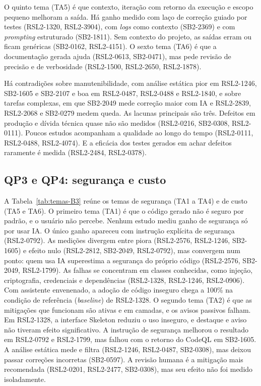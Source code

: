 O quinto tema (TA5) é que contexto, iteração com retorno da execução e escopo
pequeno melhoram a saída. Há ganho medido com laço de correção guiado por
testes (RSL2-1320, RSL2-3904), com \textit{logs} como contexto (SB2-2369) e
com \textit{prompting} estruturado (SB2-1811). Sem contexto do projeto, as
saídas erram ou ficam genéricas (SB2-0162, RSL2-4151). O sexto tema (TA6) é
que a documentação gerada ajuda (RSL2-0613, SB2-0471), mas pede revisão de
precisão e de verbosidade (RSL2-1500, RSL2-2650, RSL2-1878).

Há contradições sobre manutenibilidade, com análise estática pior em
RSL2-1246, SB2-1605 e SB2-2107 e boa em RSL2-0487, RSL2-0488 e RSL2-1840, e
sobre tarefas complexas, em que SB2-2049 mede correção maior com IA e
RSL2-2839, RSL2-2068 e SB2-0279 medem queda. As lacunas principais são três.
Defeitos em produção e dívida técnica quase não são medidos (RSL2-0216,
SB2-0308, RSL2-0111). Poucos estudos acompanham a qualidade ao longo do tempo
(RSL2-0111, RSL2-0488, RSL2-4074). E a eficácia dos testes gerados em achar
defeitos raramente é medida (RSL2-2484, RSL2-0378).

\subsection{QP3 e QP4: segurança e custo}
\label{sec:resultados-rsl2-qp3-qp4}



A Tabela~\ref{tab:temas-B3} reúne os temas de segurança (TA1 a TA4) e de
custo (TA5 e TA6). O primeiro tema (TA1) é que o código gerado não é seguro
por padrão, e o usuário não percebe. Nenhum estudo mediu ganho de segurança só
por usar IA. O único ganho apareceu com instrução explícita de segurança
(RSL2-0792). As medições divergem entre piora (RSL2-2576, RSL2-1246,
SB2-1605) e efeito nulo (RSL2-2812, SB2-2049, RSL2-0792), mas convergem num
ponto: quem usa IA superestima a segurança do próprio código (RSL2-2576,
SB2-2049, RSL2-1799). As falhas se concentram em classes conhecidas, como
injeção, criptografia, credenciais e dependências (RSL2-1328, RSL2-1246,
RSL2-0906). Com assistente envenenado, a adoção de código inseguro chega a
100\% na condição de referência (\textit{baseline}) de RSL2-1328. O segundo
tema (TA2) é que as mitigações que funcionam são ativas e em camadas, e os
avisos passivos falham. Em RSL2-1328, a interface Skeleton reduziu o uso
inseguro, e destaque e aviso não tiveram efeito significativo. A instrução
de segurança melhorou o resultado em RSL2-0792 e RSL2-1799, mas falhou com o
retorno do CodeQL em SB2-1605. A análise estática mede e filtra (RSL2-1246,
RSL2-0487, SB2-0308), mas deixou passar correções incorretas (SB2-0597). A
revisão humana é a mitigação mais recomendada (RSL2-0201, RSL2-2477,
SB2-0308), mas seu efeito não foi medido isoladamente.

